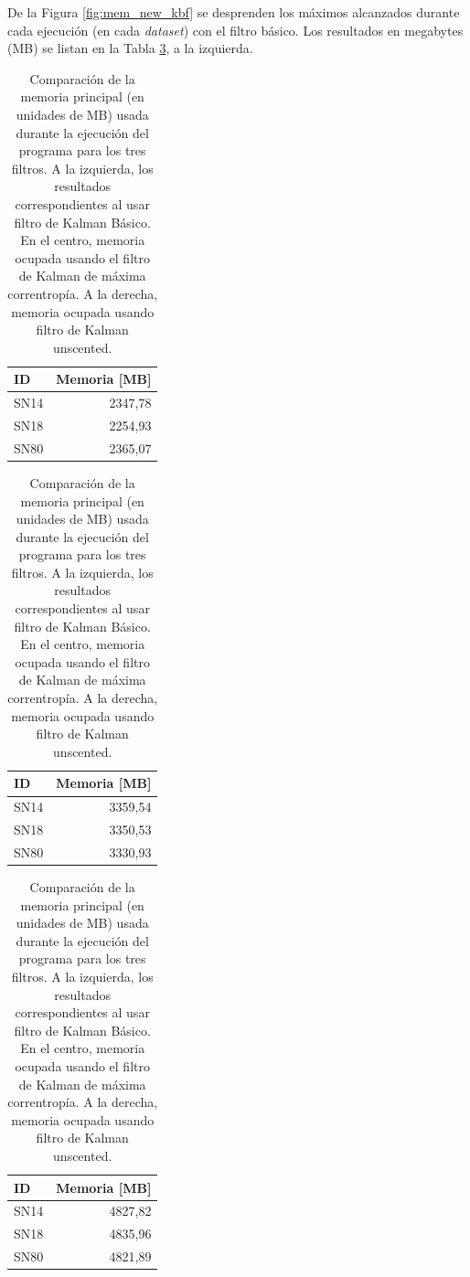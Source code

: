 De la Figura \ref{fig:mem_new_kbf} se desprenden los m\'aximos alcanzados durante cada ejecuci\'on (en cada \textit{dataset}) con el filtro b\'asico. Los resultados en megabytes (MB) se listan en la Tabla \ref{tab:mem3}, a la izquierda.
\pagebreak

        \begin{table}
        
        \caption{Comparaci\'on de la memoria principal (en unidades de MB) usada durante la ejecuci\'on del programa para los tres filtros. A la izquierda, los resultados correspondientes al usar filtro de Kalman B\'asico. En el centro, memoria ocupada usando el filtro de Kalman de m\'axima correntrop\'ia. A la derecha, memoria ocupada usando filtro de Kalman unscented.}
            \footnotesize
\begin{tabular}{|l|r|}
\hline
\textbf{ID} & Memoria [MB]\\\hline\hline
SN14 & 2347,78\\\hline
SN18 & 2254,93\\\hline
SN80 & 2365,07\\\hline
\end{tabular}
                \hfill
\begin{tabular}{|l|r|}

\hline
\textbf{ID} & Memoria [MB]\\\hline\hline
SN14 & 3359,54\\\hline
SN18 & 3350,53\\\hline
SN80 & 3330,93\\\hline
\end{tabular}
                \hfill
\begin{tabular}{|l|r|}

\hline
\textbf{ID} & Memoria [MB]\\\hline\hline
SN14 & 4827,82\\\hline
SN18 & 4835,96\\\hline
SN80 & 4821,89\\\hline
\end{tabular}
                \label{tab:mem3}
            \end{table}



